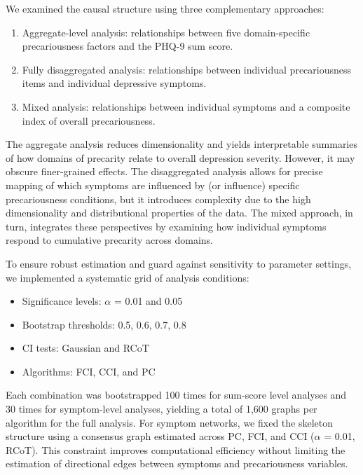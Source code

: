 \documentclass[
]{article}
\providecommand{\tightlist}{%
  \setlength{\itemsep}{0pt}\setlength{\parskip}{0pt}}\usepackage{longtable,booktabs,array}
\begin{document}
We examined the causal structure using three complementary approaches:

\begin{enumerate}
\def\labelenumi{\arabic{enumi}.}
\tightlist
\item
  Aggregate-level analysis: relationships between five domain-specific
  precariousness factors and the PHQ-9 sum score.
\item
  Fully disaggregated analysis: relationships between individual
  precariousness items and individual depressive symptoms.
\item
  Mixed analysis: relationships between individual symptoms and a
  composite index of overall precariousness.
\end{enumerate}

The aggregate analysis reduces dimensionality and yields interpretable
summaries of how domains of precarity relate to overall depression
severity. However, it may obscure finer-grained effects. The
disaggregated analysis allows for precise mapping of which symptoms are
influenced by (or influence) specific precariousness conditions, but it
introduces complexity due to the high dimensionality and distributional
properties of the data. The mixed approach, in turn, integrates these
perspectives by examining how individual symptoms respond to cumulative
precarity across domains.

To ensure robust estimation and guard against sensitivity to parameter
settings, we implemented a systematic grid of analysis conditions:

\begin{itemize}
\tightlist
\item
  Significance levels: \(\alpha\) = 0.01 and 0.05
\item
  Bootstrap thresholds: 0.5, 0.6, 0.7, 0.8
\item
  CI tests: Gaussian and RCoT
\item
  Algorithms: FCI, CCI, and PC
\end{itemize}

Each combination was bootstrapped 100 times for sum-score level analyses
and 30 times for symptom-level analyses, yielding a total of 1,600
graphs per algorithm for the full analysis. For symptom networks, we
fixed the skeleton structure using a consensus graph estimated across
PC, FCI, and CCI (\(\alpha\) = 0.01, RCoT). This constraint improves
computational efficiency without limiting the estimation of directional
edges between symptoms and precariousness variables.
\end{document}
